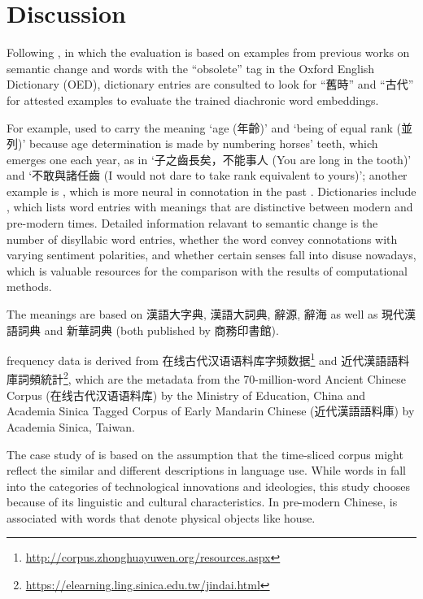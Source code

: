 



\section{Discussion}

Following \textcite{hamilton2016law}, in which the evaluation is based on examples from previous works on semantic change and words with the ``obsolete'' tag in the Oxford English Dictionary (OED), dictionary entries are consulted to look for ``舊時'' and ``古代'' for attested examples to evaluate the trained diachronic word embeddings.

For example,  used to carry the meaning `age (年齡)' and `being of equal rank (並列)' because age determination is made by numbering horses' teeth, which emerges one each year, as in `子之齒長矣，不能事人 (You are long in the tooth)' and `不敢與諸任齒 (I would not dare to take rank equivalent to yours)'; another example is , which is more neural in connotation in the past \parencite[前言]{wang1997gujinyiyi}. Dictionaries include \textcite{wang1997gujinyiyi,liu1992gujinyi}, which lists word entries with meanings that are distinctive between modern and pre-modern times. Detailed information relavant to semantic change is the number of disyllabic word entries, whether the word convey connotations with varying sentiment polarities, and whether certain senses fall into disuse nowadays, which is valuable resources for the comparison with the results of computational methods. 

The meanings are based on 漢語大字典, 漢語大詞典, 辭源, 辭海 as well as 現代漢語詞典 and 新華詞典 (both published by 商務印書館).

frequency data is derived from 在线古代汉语语料库字频数据\footnote{\url{http://corpus.zhonghuayuwen.org/resources.aspx}} and 近代漢語語料庫詞頻統計\footnote{\url{https://elearning.ling.sinica.edu.tw/jindai.html}}, which are the metadata from the 70-million-word Ancient Chinese Corpus (在线古代汉语语料库) by the Ministry of Education, China and Academia Sinica Tagged Corpus of Early Mandarin Chinese (近代漢語語料庫) by Academia Sinica, Taiwan.

The case study of \jia is based on the assumption that the time-sliced corpus might reflect the similar and different descriptions in language use. While words in  fall into the categories of technological innovations and ideologies, this study chooses \jia because of its linguistic and cultural characteristics. In pre-modern Chinese, \jia is associated with words that denote physical objects like house.


